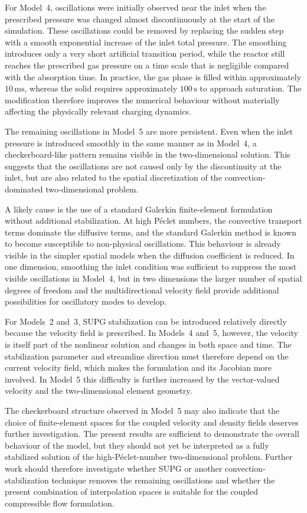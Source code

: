 For Model~4, oscillations were initially observed near the inlet when the prescribed pressure was changed almost discontinuously at the start of the simulation. These oscillations could be removed by replacing the sudden step with a smooth exponential increase of the inlet total pressure. The smoothing introduces only a very short artificial transition period, while the reactor still reaches the prescribed gas pressure on a time scale that is negligible compared with the absorption time. In practice, the gas phase is filled within approximately $10\,\mathrm{ms}$, whereas the solid requires approximately $100\,\mathrm{s}$ to approach saturation. The modification therefore improves the numerical behaviour without materially affecting the physically relevant charging dynamics.

The remaining oscillations in Model~5 are more persistent. Even when the inlet pressure is introduced smoothly in the same manner as in Model~4, a checkerboard-like pattern remains visible in the two-dimensional solution. This suggests that the oscillations are not caused only by the discontinuity at the inlet, but are also related to the spatial discretization of the convection-dominated two-dimensional problem.

A likely cause is the use of a standard Galerkin finite-element formulation without additional stabilization. At high P\'eclet numbers, the convective transport terms dominate the diffusive terms, and the standard Galerkin method is known to become susceptible to non-physical oscillations. This behaviour is already visible in the simpler spatial models when the diffusion coefficient is reduced. In one dimension, smoothing the inlet condition was sufficient to suppress the most visible oscillations in Model~4, but in two dimensions the larger number of spatial degrees of freedom and the multidirectional velocity field provide additional possibilities for oscillatory modes to develop.

For Models~2 and~3, SUPG stabilization can be introduced relatively directly because the velocity field is prescribed. In Models~4 and~5, however, the velocity is itself part of the nonlinear solution and changes in both space and time. The stabilization parameter and streamline direction must therefore depend on the current velocity field, which makes the formulation and its Jacobian more involved. In Model~5 this difficulty is further increased by the vector-valued velocity and the two-dimensional element geometry.

The checkerboard structure observed in Model~5 may also indicate that the choice of finite-element spaces for the coupled velocity and density fields deserves further investigation. The present results are sufficient to demonstrate the overall behaviour of the model, but they should not yet be interpreted as a fully stabilized solution of the high-P\'eclet-number two-dimensional problem. Further work should therefore investigate whether SUPG or another convection-stabilization technique removes the remaining oscillations and whether the present combination of interpolation spaces is suitable for the coupled compressible flow formulation.

